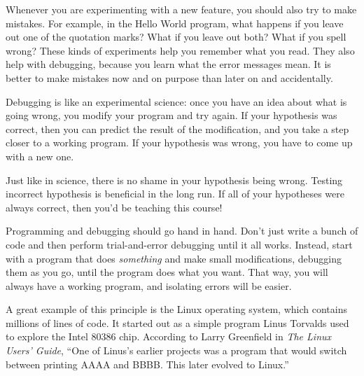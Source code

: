 
Whenever you are experimenting with a new feature, you should also try to make mistakes.
For example, in the Hello World program, what happens if you leave out one of the quotation marks?
What if you leave out both?
What if you spell  wrong?
These kinds of experiments help you remember what you read.
They also help with debugging, because you learn what the error messages mean.
It is better to make mistakes now and on purpose than later on and accidentally.



Debugging is like an experimental science: once you have an idea about what is going wrong, you modify your program and try again.
If your hypothesis was correct, then you can predict the result of the modification, and you take a step closer to a working program.
If your hypothesis was wrong, you have to come up with a new one.

Just like in science, there is no shame in your hypothesis being wrong. Testing incorrect hypothesis is beneficial in the long run. If all of your hypotheses were always correct, then you'd be teaching this course!

Programming and debugging should go hand in hand.
Don't just write a bunch of code and then perform trial-and-error debugging until it all works.
Instead, start with a program that does {\em something} and make small modifications, debugging them as you go, until the program does what you want.
That way, you will always have a working program, and isolating errors will be easier.


A great example of this principle is the Linux operating system, which contains millions of lines of code.
It started out as a simple program Linus Torvalds used to explore the Intel 80386 chip.
According to Larry Greenfield in {\it The Linux Users' Guide}, ``One of Linus's earlier projects was a program that would switch between printing AAAA and BBBB.
This later evolved to Linux.''


